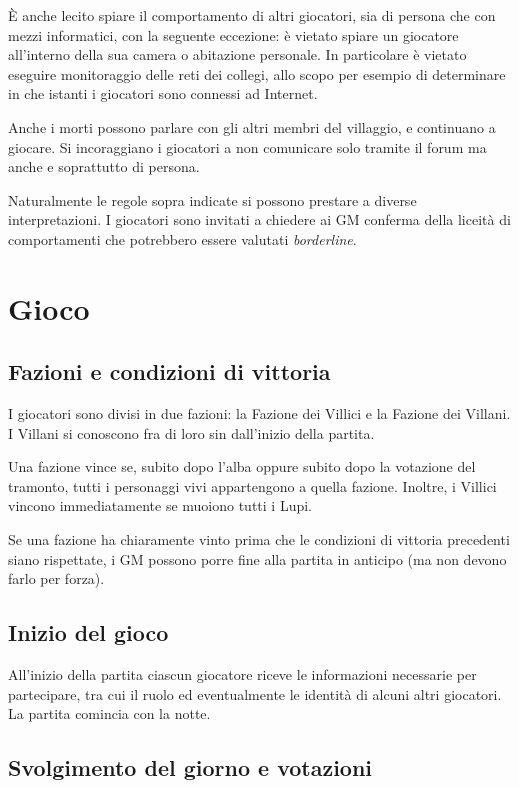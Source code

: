 \documentclass[a4paper,10pt]{article}
\begin{document}
È anche lecito spiare il comportamento di altri giocatori, sia di persona che con mezzi informatici, con la seguente eccezione: è vietato spiare un giocatore all'interno della sua camera o abitazione personale. In particolare è vietato eseguire monitoraggio delle reti dei collegi, allo scopo per esempio di determinare in che istanti i giocatori sono connessi ad Internet.

Anche i morti possono parlare con gli altri membri del villaggio, e continuano a giocare. Si incoraggiano i giocatori a non comunicare solo tramite il forum ma anche e soprattutto di persona.

Naturalmente le regole sopra indicate si possono prestare a diverse interpretazioni. I giocatori sono invitati a chiedere ai GM conferma della liceità di comportamenti che potrebbero essere valutati \emph{borderline}.

\pagebreak

\section{Gioco}

\subsection{Fazioni e condizioni di vittoria}

I giocatori sono divisi in due fazioni: la Fazione dei Villici e la Fazione dei Villani. I Villani si conoscono fra di loro sin dall'inizio della partita.

Una fazione vince se, subito dopo l'alba oppure subito dopo la votazione del tramonto, tutti i personaggi vivi appartengono a quella fazione. Inoltre, i Villici vincono immediatamente se muoiono tutti i Lupi.

Se una fazione ha chiaramente vinto prima che le condizioni di vittoria precedenti siano rispettate, i GM possono porre fine alla partita in anticipo (ma non devono farlo per forza).

\subsection{Inizio del gioco}

All'inizio della partita ciascun giocatore riceve le informazioni necessarie per partecipare, tra cui il ruolo ed eventualmente le identità di alcuni altri giocatori. La partita comincia con la notte.


\subsection{Svolgimento del giorno e votazioni}
\end{document}
